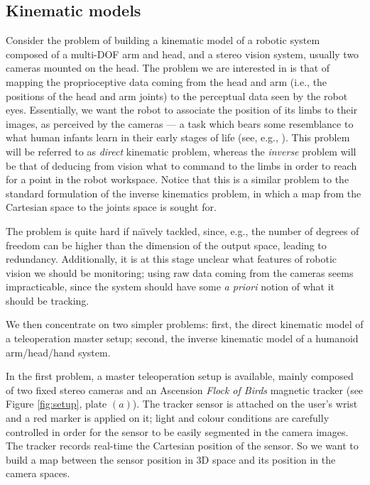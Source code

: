 \documentclass[conference]{IEEEtran}
\begin{document}
\subsection{Kinematic models}
\label{subs:kinmod}

Consider the problem of building a kinematic model of a robotic
system composed of a multi-DOF arm and head, and a stereo vision
system, usually two cameras mounted on the head. The problem we are
interested in is that of mapping the proprioceptive data coming from
the head and arm (i.e., the positions of the head and arm joints) to
the perceptual data seen by the robot eyes. Essentially, we want the
robot to associate the position of its limbs to their images, as
perceived by the cameras --- a task which bears some resemblance to
what human infants learn in their early stages of life (see, e.g.,
\cite{VonHofsten2004}). This problem will be referred to as
\emph{direct} kinematic problem, whereas the \emph{inverse} problem
will be that of deducing from vision what to command to the limbs in
order to reach for a point in the robot workspace. Notice that this is
a similar problem to the standard formulation of the inverse
kinematics problem, in which a map from the Cartesian space to the
joints space is sought for.

The problem is quite hard if na\"\i vely tackled, since, e.g., the
number of degrees of freedom can be higher than the dimension of the
output space, leading to redundancy. Additionally, it is at this stage
unclear what features of robotic vision we should be monitoring; using
raw data coming from the cameras seems impracticable, since the system
should have some \emph{a priori} notion of what it should be tracking.

We then concentrate on two simpler problems: first, the direct
kinematic model of a teleoperation master setup; second, the inverse
kinematic model of a humanoid arm/head/hand system.

In the first problem, a master teleoperation setup is available,
mainly composed of two fixed stereo cameras and an Ascension
\emph{Flock of Birds} magnetic tracker (see Figure
\ref{fig:setup}, plate $(a)$). The tracker sensor is attached on the user's wrist
and a red marker is applied on it; light and colour conditions are
carefully controlled in order for the sensor to be easily segmented in
the camera images. The tracker records real-time the Cartesian
position of the sensor. So we want to build a map between the sensor
position in 3D space and its position in the camera spaces.
\end{document}
